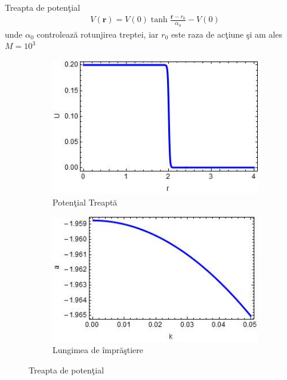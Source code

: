\begin{frame}[allowframebreaks]{Treapta de poten\c{t}ial}
\begin{align}
V({\bm r})=V(0)\tanh{\frac{{\bm r}-r_0}{\alpha_0}}-V(0)
\end{align}
unde $\alpha_0$ controleaz\u{a} rotunjirea treptei, iar $r_0$ este raza de ac\c{t}iune \c{s}i am ales $M =10^3$ 

\begin{figure}[h!]
\centering
\begin{subfigure}{.5\textwidth}
  \centering
  \includegraphics[width=0.9\linewidth]{PotentialTreapta}
  \caption{Poten\c{t}ial Treapt\u{a}}
  \label{fig:sub311}
\end{subfigure}%
\begin{subfigure}{.5\textwidth}
  \centering
  \includegraphics[width=0.9\linewidth]{LungimeImprastiereTreapta}
  \caption{Lungimea de \^{i}mpr\u{a}\c{s}tiere}
  \label{fig:sub312}
\end{subfigure}
\caption{Treapta de poten\c{t}ial}
\label{fig:treapta}
\end{figure}

\end{frame}

